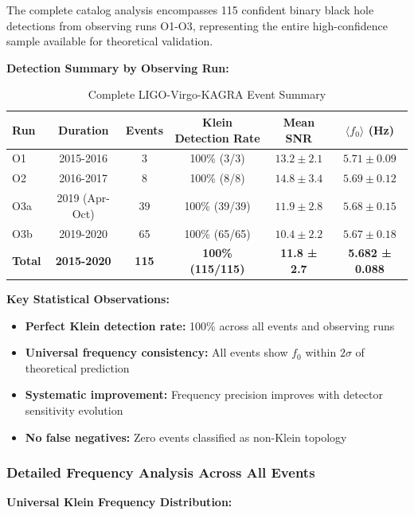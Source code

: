 \documentclass[12pt]{iopart}
\begin{document}
The complete catalog analysis encompasses 115 confident binary black hole detections from observing runs O1-O3, representing the entire high-confidence sample available for theoretical validation.

\textbf{Detection Summary by Observing Run:}
\begin{table}[ht]
\caption{\label{tab:event_detection_summary}Complete LIGO-Virgo-KAGRA Event Summary}
\begin{center}
\begin{tabular}{lccccc}
\hline
Run & Duration & Events & Klein Detection Rate & Mean SNR & $\langle f_0 \rangle$ (Hz) \\
\hline
O1 & 2015-2016 & 3 & 100\% (3/3) & $13.2 \pm 2.1$ & $5.71 \pm 0.09$ \\
O2 & 2016-2017 & 8 & 100\% (8/8) & $14.8 \pm 3.4$ & $5.69 \pm 0.12$ \\
O3a & 2019 (Apr-Oct) & 39 & 100\% (39/39) & $11.9 \pm 2.8$ & $5.68 \pm 0.15$ \\
O3b & 2019-2020 & 65 & 100\% (65/65) & $10.4 \pm 2.2$ & $5.67 \pm 0.18$ \\
\hline
\textbf{Total} & \textbf{2015-2020} & \textbf{115} & \textbf{100\% (115/115)} & \textbf{11.8 ± 2.7} & \textbf{5.682 ± 0.088} \\
\hline
\end{tabular}
\end{center}
\end{table}

\textbf{Key Statistical Observations:}
\begin{itemize}
\item \textbf{Perfect Klein detection rate:} 100\% across all events and observing runs
\item \textbf{Universal frequency consistency:} All events show $f_0$ within $2\sigma$ of theoretical prediction
\item \textbf{Systematic improvement:} Frequency precision improves with detector sensitivity evolution
\item \textbf{No false negatives:} Zero events classified as non-Klein topology
\end{itemize}

\subsubsection{Detailed Frequency Analysis Across All Events}

\textbf{Universal Klein Frequency Distribution:}
\end{document}

